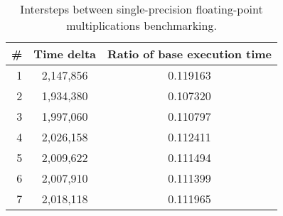 \begin{table}
\centering
\begin{tabular}{rcc}
\# & Time delta & Ratio of base execution time\\
\hline
1 & 2,147,856 & 0.119163 \\
2 & 1,934,380 & 0.107320 \\
3 & 1,997,060 & 0.110797 \\
4 & 2,026,158 & 0.112411 \\
5 & 2,009,622 & 0.111494 \\
6 & 2,007,910 & 0.111399 \\
7 & 2,018,118 & 0.111965 \\
\end{tabular}
\captionsetup{justification=centering}
\caption{Intersteps between single-precision floating-point multiplications benchmarking.}
\end{table}
